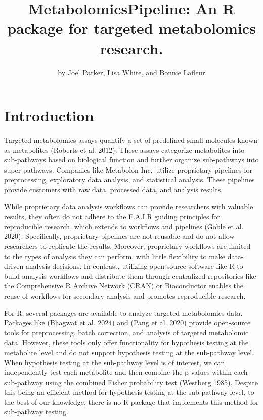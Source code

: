 \title{MetabolomicsPipeline: An R package for targeted metabolomics research.}


\author{by Joel Parker, Lisa White, and Bonnie Lafleur}

\maketitle


\section{Introduction}\label{introduction}

Targeted metabolomics assays quantify a set of predefined small molecules known as metabolites (Roberts et al. 2012). These assays categorize metabolites into sub-pathways based on biological function and further organize sub-pathways into super-pathways. Companies like Metabolon Inc.~utilize proprietary pipelines for preprocessing, exploratory data analysis, and statistical analysis. These pipelines provide customers with raw data, processed data, and analysis results.

While proprietary data analysis workflows can provide researchers with valuable results, they often do not adhere to the F.A.I.R guiding principles for reproducible research, which extends to workflows and pipelines (Goble et al. 2020). Specifically, proprietary pipelines are not reusable and do not allow researchers to replicate the results. Moreover, proprietary workflows are limited to the types of analysis they can perform, with little flexibility to make data-driven analysis decisions. In contrast, utilizing open source software like R to build analysis workflows and distribute them through centralized repositories like the Comprehensive R Archive Network (CRAN) or Bioconductor enables the reuse of workflows for secondary analysis and promotes reproducible research.

For R, several packages are available to analyze targeted metabolomics data. Packages like  (Bhagwat et al. 2024) and  (Pang et al. 2020) provide open-source tools for preprocessing, batch correction, and analysis of targeted metabolomic data. However, these tools only offer functionality for hypothesis testing at the metabolite level and do not support hypothesis testing at the sub-pathway level. When hypothesis testing at the sub-pathway level is of interest, we can independently test each metabolite and then combine the p-values within each sub-pathway using the combined Fisher probability test (Westberg 1985). Despite this being an efficient method for hypothesis testing at the sub-pathway level, to the best of our knowledge, there is no R package that implements this method for sub-pathway testing.

